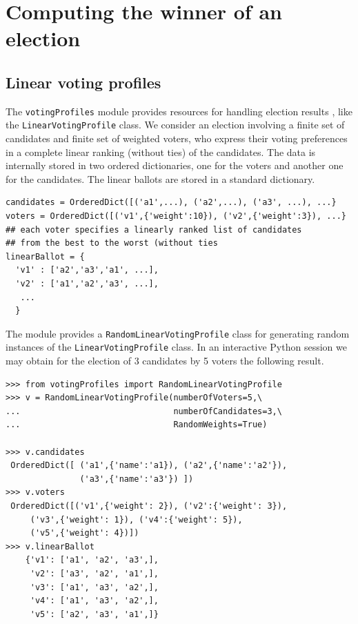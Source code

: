 \chapter{Computing the winner of an election}
\label{sec:7}



\section{Linear voting profiles}
\label{sec:7.1}

The {\tt votingProfiles} module provides resources for handling election results \cite{ADT-L2}, like the \texttt{LinearVotingProfile} class. We consider an election involving a finite set of candidates and finite set of weighted voters, who express their voting preferences in a complete linear ranking (without ties) of the candidates. The data is internally stored in two ordered dictionaries, one for the voters and another one for the candidates. The linear ballots are stored in a standard dictionary.

\begin{lstlisting}[basicstyle=\footnotesize]
candidates = OrderedDict([('a1',...), ('a2',...), ('a3', ...), ...}
voters = OrderedDict([('v1',{'weight':10}), ('v2',{'weight':3}), ...}
## each voter specifies a linearly ranked list of candidates
## from the best to the worst (without ties
linearBallot = {
  'v1' : ['a2','a3','a1', ...],
  'v2' : ['a1','a2','a3', ...],
   ...
  }
\end{lstlisting}

The module provides a \texttt{RandomLinearVotingProfile} class for generating random instances of the \texttt{LinearVotingProfile} class. In an interactive Python session we may obtain for the election of 3 candidates by 5 voters the following result.

\begin{lstlisting}[caption={Example of random linear voting profile},label=list:7.1,basicstyle=\footnotesize]
>>> from votingProfiles import RandomLinearVotingProfile
>>> v = RandomLinearVotingProfile(numberOfVoters=5,\
...                               numberOfCandidates=3,\
...                               RandomWeights=True)
   
>>> v.candidates
 OrderedDict([ ('a1',{'name':'a1}), ('a2',{'name':'a2'}),
               ('a3',{'name':'a3'}) ])
>>> v.voters
 OrderedDict([('v1',{'weight': 2}), ('v2':{'weight': 3}), 
     ('v3',{'weight': 1}), ('v4':{'weight': 5}), 
     ('v5',{'weight': 4})])
>>> v.linearBallot
    {'v1': ['a1', 'a2', 'a3',],
     'v2': ['a3', 'a2', 'a1',],
     'v3': ['a1', 'a3', 'a2',],
     'v4': ['a1', 'a3', 'a2',],
     'v5': ['a2', 'a3', 'a1',]} 
 \end{lstlisting}

